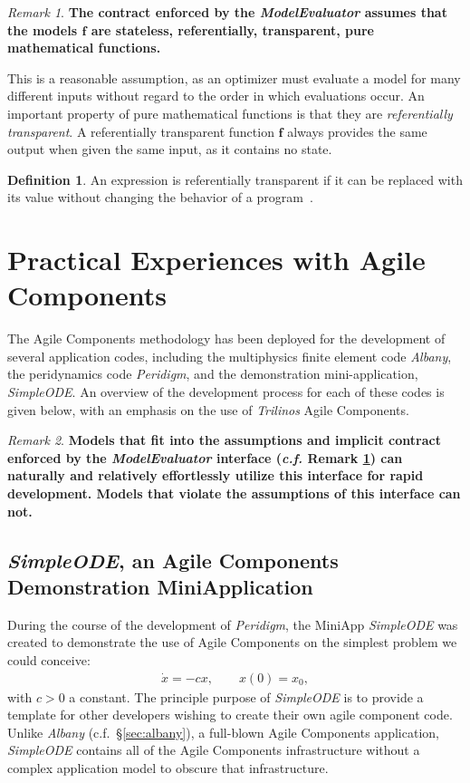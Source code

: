 \documentclass[pdf,ps2pdf,12pt,report]{SANDreport}
\theoremstyle{plain}
\theoremstyle{definition}
\newtheorem{defn}{Definition}[section]
\theoremstyle{remark}
\newtheorem{rem}{Remark}[section]
\numberwithin{equation}{section}
\begin{document}
\begin{rem} \label{rem:MEContract}
\textbf{The contract enforced by the \emph{ModelEvaluator} assumes that the models $\mathbf{f}$ are stateless, referentially, transparent, pure mathematical functions.}
\end{rem}

This is a reasonable assumption, as an optimizer must evaluate a model for many different inputs without regard to the order in which evaluations occur. An important property of pure mathematical functions is that they are \emph{referentially transparent}. A referentially transparent function $\mathbf{f}$ always provides the same output when given the same input, as it contains no state.
\begin{defn} \label{defn:RT}
An expression is referentially transparent if it can be replaced with its value without changing the behavior of a program~\cite{HGVJ:1994:DesignPatterns}.
\end{defn}

\section{Practical Experiences with Agile Components}

The Agile Components methodology has been deployed for the development of several application codes, including the multiphysics finite element code \emph{Albany}, the peridynamics code \emph{Peridigm}, and the demonstration mini-application, \emph{SimpleODE}.  An overview of the development process for each of these codes is given below, with an emphasis on the use of \emph{Trilinos} Agile Components.

\begin{rem}
\textbf{Models that fit into the assumptions and implicit contract enforced by the \emph{ModelEvaluator} interface (\emph{c.f.} Remark \ref{rem:MEContract}) can naturally and relatively effortlessly utilize this interface for rapid development. Models that violate the assumptions of this interface can not.}
\end{rem}

\subsection{\emph{SimpleODE}, an Agile Components Demonstration MiniApplication} \label{sec:simpleode}

During the course of the development of \emph{Peridigm}, the MiniApp \emph{SimpleODE} was created to demonstrate the use of Agile Components on the simplest problem we could conceive:
\begin{align}
  \dot{x} = -c x, \qquad x(0)=x_0,
\end{align}
with $c>0$ a constant. The principle purpose of \emph{SimpleODE} is to provide a template for other developers wishing to create their own agile component code. Unlike \emph{Albany} (c.f.~\S\ref{sec:albany}), a full-blown Agile Components application, \emph{SimpleODE} contains all of the Agile Components infrastructure without a complex application model to obscure that infrastructure.
\end{document}
